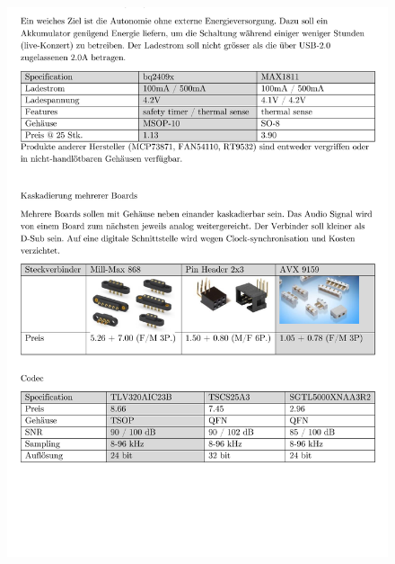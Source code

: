 \begin{appendix}
\begin{figure}[h]
	\centering
	\includegraphics[width=0.95\linewidth]{appendix/pflichtenheft (3).pdf}
\end{figure}


\end{appendix}
